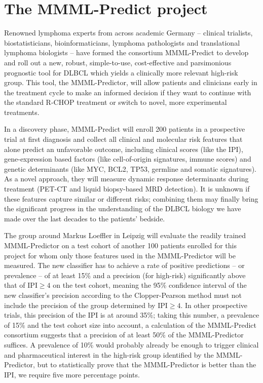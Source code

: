\section{The MMML-Predict project} \label{sec:intro-mmml}

Renowned lymphoma experts from across academic Germany -- clinical trialists, biostatisticians, 
bioinformaticians, lymphoma pathologists and translational lymphoma biologists -- have formed the 
consortium MMML-Predict to develop and roll out a new, robust, simple-to-use, cost-effective and 
parsimonious prognostic tool for DLBCL 
which yields a clinically more relevant high-risk group. This tool, the MMML-Predictor, will allow 
patients and clinicians early in the treatment cycle to make an informed decision if they want to 
continue with the standard R-CHOP treatment or switch to novel, more experimental treatments. 

In a discovery phase, MMML-Predict will enroll 200 patients in a prospective trial at first diagnosis and 
collect all clinical and molecular risk features that alone predict an unfavorable outcome, 
including clinical scores (like the IPI), gene-expression based factors (like cell-of-origin signatures,
immune scores) and genetic determinants (like MYC, BCL2, TP53, germline and somatic signatures).
As a novel approach, they will measure dynamic response determinants during treatment (PET-CT 
and liquid biopsy-based MRD detection). It is unknown if these features capture similar or different 
risks; combining them may finally bring the significant progress in the understanding of the DLBCL 
biology we have made over the last decades to the patients' bedside.

The group around Markus Loeffler in Leipzig will evaluate the readily trained MMML-Predictor on a 
test cohort of another 100 patients enrolled for this project for whom only those features used 
in the MMML-Predictor will be measured. The new classifier has to achieve a rate of positive 
predictions -- or prevalence -- of at least \num{15}\% and a precision (for high-risk) significantly above that of 
$\text{IPI} \geq 4$ on the test cohort, meaning the \num{95}\% confidence interval of the new 
classifier's precision according to the Clopper-Pearson method must not include the precision of 
the group determined by $\text{IPI} \geq 4$. In other prospective trials, this precision of the IPI 
is at around \num{35}\%; taking this number, a prevalence of \num{15}\% and the test cohort size into 
account, a calculation of the MMML-Predict consortium suggests that a precision of at least \num{50}\%
of the MMML-Predictor suffices. A prevalence of \num{10}\% would probably already be enough to 
trigger clinical and pharmaceutical interest in the high-risk group identified by the MMML-Predictor, 
but to statistically prove that the MMML-Predictor is better than the IPI, we require five more 
percentage points.

